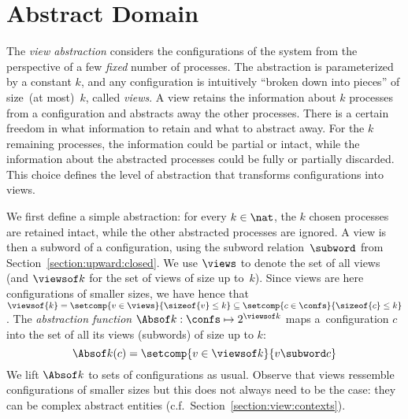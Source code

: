 \section{Abstract Domain}
\label{section:view:abstraction}
%


The \emph{view abstraction} considers the configurations of the system
from the perspective of a few \emph{fixed} number of processes.
%
The abstraction is parameterized by a constant $k$, and any
configuration is intuitively ``broken down into pieces'' of size~(at
most)~$k$, called \emph{views}.
%
A view retains the information about $k$ processes from a
configuration and abstracts away the other processes. %
There is a certain freedom in what information to retain and what to
abstract away. %
For the $k$ remaining processes, the information could be partial
or %
intact, while the information about the abstracted processes could be
fully or partially discarded. %
This choice defines the level of abstraction that transforms
configurations into views. %

%
We first define a simple abstraction: for every $k\in\nat$, the $k$
chosen processes are retained intact, while the other abstracted
processes are ignored. %
%
A view is then a subword of a configuration, using the subword
relation~$\subword$ from Section~\ref{section:upward:closed}. %
% 
We use $\views$ to denote the set of all views (and $\viewsof k$ for
the set of views of size up to~$k$). %
Since views are here configurations of smaller sizes, we have hence
that %
$\viewsof{k} = \setcomp{v\in\views}{\sizeof{v}\leq k} \subseteq
\setcomp{c\in\confs}{\sizeof{c}\leq k}$.
%
The \emph{abstraction function} %
$\Absof k : \confs\mapsto 2^{\viewsof k}$ maps a~configuration $c$
into the set of
all its views (subwords) of size up to $k$:
%
$$\Absof k (c) = \setcomp{v\in\viewsof k}{v\subword c}$$
% 
We lift $\Absof k$ to sets of configurations as usual.
% 
Observe that views ressemble configurations of smaller sizes but this
does not always need to be the case: they can be complex abstract
entities (c.f.\ Section~\ref{section:view:contexts}). %

